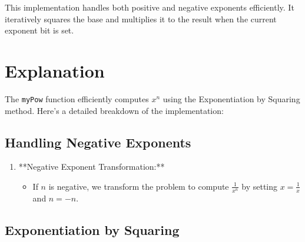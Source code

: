 This implementation handles both positive and negative exponents efficiently. It iteratively squares the base and multiplies it to the result when the current exponent bit is set.

\section*{Explanation}

The \texttt{myPow} function efficiently computes \(x^n\) using the Exponentiation by Squaring method. Here's a detailed breakdown of the implementation:

\subsection*{Handling Negative Exponents}

\begin{enumerate}
    \item **Negative Exponent Transformation:**
    \begin{itemize}
        \item If \(n\) is negative, we transform the problem to compute \(\frac{1}{x^n}\) by setting \(x = \frac{1}{x}\) and \(n = -n\).
    \end{itemize}
\end{enumerate}

\subsection*{Exponentiation by Squaring}

